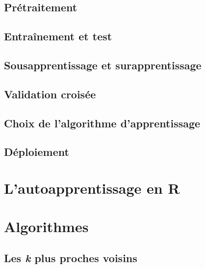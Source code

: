 \documentclass[]{book}
\begin{document}
\hypertarget{pruxe9traitement}{%
\subsection{Prétraitement}\label{pruxe9traitement}}

\hypertarget{entrauxeenement-et-test}{%
\subsection{Entraînement et test}\label{entrauxeenement-et-test}}

\hypertarget{sousapprentissage-et-surapprentissage}{%
\subsection{Sousapprentissage et
surapprentissage}\label{sousapprentissage-et-surapprentissage}}

\hypertarget{validation-croisuxe9e}{%
\subsection{Validation croisée}\label{validation-croisuxe9e}}

\hypertarget{choix-de-lalgorithme-dapprentissage}{%
\subsection{Choix de l'algorithme
d'apprentissage}\label{choix-de-lalgorithme-dapprentissage}}

\hypertarget{duxe9ploiement}{%
\subsection{Déploiement}\label{duxe9ploiement}}

\hypertarget{lautoapprentissage-en-r}{%
\section{L'autoapprentissage en R}\label{lautoapprentissage-en-r}}

\hypertarget{algorithmes}{%
\section{Algorithmes}\label{algorithmes}}

\hypertarget{les-k-plus-proches-voisins}{%
\subsection{\texorpdfstring{Les \emph{k} plus proches
voisins}{Les k plus proches voisins}}\label{les-k-plus-proches-voisins}}
\end{document}
